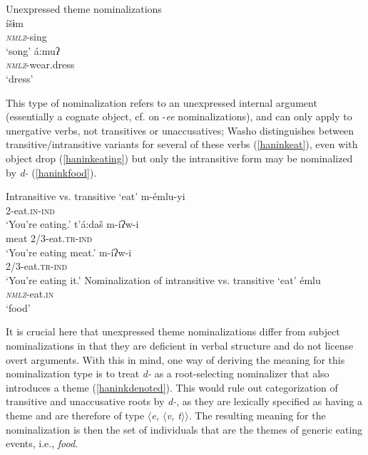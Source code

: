 \documentclass[output=paper]{langscibook}
\begin{document}
\ea Unexpressed theme nominalizations\label{haninkinternal}\\
\ea {}íšɨm\\
\textit{\textsc{nmlz}}-sing\\
\glt `song'
\ex {}á:muʔ\\
\textit{\textsc{nmlz}}-wear.dress\\
\glt `dress' 
\z
\z 


This type of nominalization refers to an unexpressed internal argument (essentially a cognate object, cf. \citet{barker1998} on -{\itshape ee} nominalizations), and can only apply to unergative verbs, not transitives or unaccusatives; Washo distinguishes between transitive/intransitive variants for several of these verbs (\ref{haninkeat}), even with object drop (\ref{haninkeating}) but only the intransitive form may be nominalized by {\itshape d-} (\ref{haninkfood}).


\ea Intransitive vs. transitive `eat'\label{haninkeat}
\ea \gll m-émlu-yi\\
2-eat.{\scshape in}-{\scshape ind}\\
\glt `You're eating.'
\ex \gll t'á:daš m-íʔw-i\\
meat 2/3-eat.{\scshape tr}-{\scshape ind}\\
\glt `You're eating meat.'
\ex \gll  m-íʔw-i\\
2/3-eat.{\scshape tr}-{\scshape ind}\\
\glt `You're eating it.' \hfill \citep[149]{jacobsen1979} \label{haninkeating}
\z
\ex Nominalization of intransitive vs. transitive `eat'\label{haninkfood}
\ea {}émlu\\
\textit{\textsc{nmlz}}-eat.{\scshape in}\\
\glt `food'
\z
\z

It is crucial here that unexpressed theme nominalizations differ from subject nominalizations in that they are deficient in verbal structure and do not license overt arguments. With this in mind, one way of deriving the meaning for this nominalization type is to treat {\itshape d-} as a root-selecting nominalizer that also introduces a theme (\ref{haninkdenoted}). This would rule out categorization of transitive and unaccusative roots by {\itshape d-}, as they are lexically specified as having a theme and are therefore of type \textit{$\langle$e, $\langle$v, t$\rangle$$\rangle$}. The resulting meaning for the nominalization is then the set of individuals that are the themes of  generic eating events, i.e., {\itshape food}.
\end{document}
